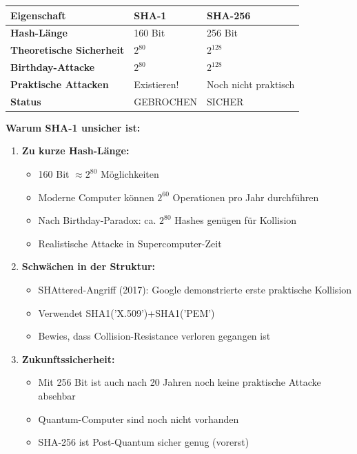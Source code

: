 \documentclass[12pt,a4paper]{article}
\begin{document}
\begin{tcolorbox}[colback=solutionbg, colframe=black!30]
\centering
\begin{tabular}{|l|l|l|}
    \hline
    \textbf{Eigenschaft} & \textbf{SHA-1} & \textbf{SHA-256} \\
    \hline
    \textbf{Hash-Länge} & 160 Bit & 256 Bit \\
    \hline
    \textbf{Theoretische Sicherheit} & $2^{80}$ & $2^{128}$ \\
    \hline
    \textbf{Birthday-Attacke} & $2^{80}$ & $2^{128}$ \\
    \hline
    \textbf{Praktische Attacken} & Existieren! & Noch nicht praktisch \\
    \hline
    \textbf{Status} & GEBROCHEN & SICHER \\
    \hline
\end{tabular}

\textbf{Warum SHA-1 unsicher ist:}

\begin{enumerate}[1.]
    \item \textbf{Zu kurze Hash-Länge:}
    \begin{itemize}
        \item 160 Bit $\approx 2^{80}$ Möglichkeiten
        \item Moderne Computer können $2^{60}$ Operationen pro Jahr durchführen
        \item Nach Birthday-Paradox: ca. $2^{80}$ Hashes genügen für Kollision
        \item Realistische Attacke in Supercomputer-Zeit
    \end{itemize}
    
    \item \textbf{Schwächen in der Struktur:}
    \begin{itemize}
        \item SHAttered-Angriff (2017): Google demonstrierte erste praktische Kollision
        \item Verwendet SHA1('X.509')+SHA1('PEM')
        \item Bewies, dass Collision-Resistance verloren gegangen ist
    \end{itemize}
    
    \item \textbf{Zukunftssicherheit:}
    \begin{itemize}
        \item Mit 256 Bit ist auch nach 20 Jahren noch keine praktische Attacke absehbar
        \item Quantum-Computer sind noch nicht vorhanden
        \item SHA-256 ist Post-Quantum sicher genug (vorerst)
    \end{itemize}
\end{enumerate}

\end{tcolorbox}
\end{document}
